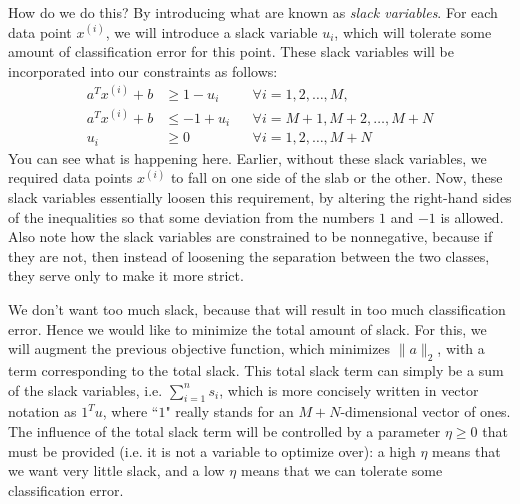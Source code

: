 \documentclass[a4paper]{article}
\theoremstyle{definition}
\begin{document}
How do we do this?
By introducing what are known as \textit{slack variables}.
For each data point $x^{(i)}$, we will introduce a slack variable $u_i$, which will tolerate some amount of classification error for this point.
These slack variables will be incorporated into our constraints as follows:
\begin{align*}
	a^T x^{(i)} + b & \geq 1 - u_i && \forall i = 1, 2, \dots, M, \\
	a^T x^{(i)} + b & \leq -1 + u_i && \forall i = M{+}1, M{+}2, \dots, M{+}N \\
	u_i & \geq 0 && \forall i = 1, 2, \dots, M{+}N
\end{align*}
You can see what is happening here.
Earlier, without these slack variables, we required data points $x^{(i)}$ to fall on one side of the slab or the other.
Now, these slack variables essentially loosen this requirement, by altering the right-hand sides of the inequalities so that some deviation from the numbers $1$ and $-1$ is allowed.
Also note how the slack variables are constrained to be nonnegative, because if they are not, then instead of loosening the separation between the two classes, they serve only to make it more strict.

We don't want too much slack, because that will result in too much classification error.
Hence we would like to minimize the total amount of slack.
For this, we will augment the previous objective function, which minimizes $\| a \|_2$, with a term corresponding to the total slack.
This total slack term can simply be a sum of the slack variables, i.e. $\sum_{i=1}^n s_i$, which is more concisely written in vector notation as $1^T u$, where ``$1$" really stands for an $M{+}N$-dimensional vector of ones.
The influence of the total slack term will be controlled by a parameter $\eta \geq 0$ that must be provided (i.e. it is not a variable to optimize over): a high $\eta$ means that we want very little slack, and a low $\eta$ means that we can tolerate some classification error.
\end{document}
